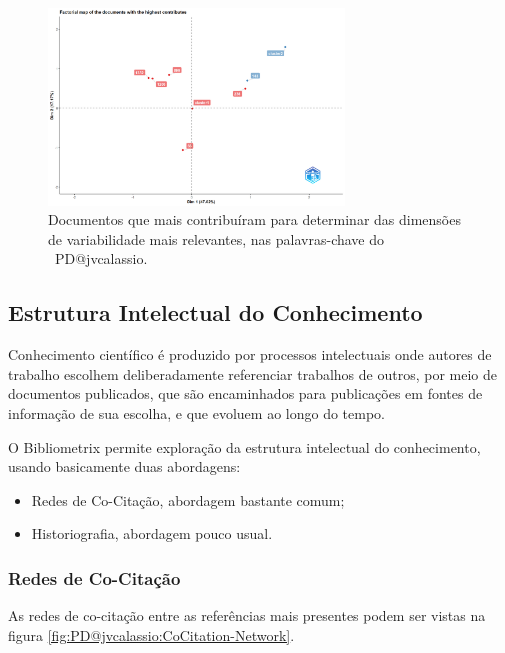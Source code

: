 \begin{figure}
    \centering
    \includegraphics[width=0.7\textwidth]{exploratory-data-analysis/jvcalassio/PesqBibliogr/PrisonersDilemma/WoS-20221201/Dataset/MostContribDocuments-2022-12-03.png}
    \caption{Documentos que mais contribuíram para determinar das dimensões de variabilidade mais relevantes, nas palavras-chave do  \dataset\ PD@jvcalassio.}
    \label{fig:PD@jvcalassio:FactorialAnalysis-MCA-MostContribDocuments}
\end{figure}

\subsection{Estrutura Intelectual do Conhecimento}

Conhecimento científico é produzido por processos intelectuais onde autores de trabalho escolhem deliberadamente referenciar trabalhos de outros, por meio de documentos publicados, que são encaminhados para publicações em fontes de informação de sua escolha, e que evoluem ao longo do tempo.

O Bibliometrix permite exploração da estrutura intelectual do conhecimento, usando basicamente duas abordagens:
\begin{itemize}
    \item Redes de Co-Citação, abordagem bastante comum;
    \item Historiografia, abordagem pouco usual.
\end{itemize}

\subsubsection{Redes de Co-Citação}

As redes de co-citação entre as referências mais presentes podem ser vistas na figura \ref{fig:PD@jvcalassio:CoCitation-Network}.

